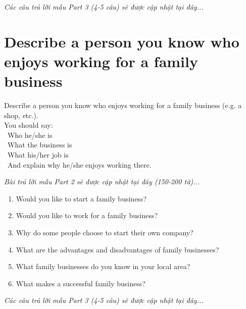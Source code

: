 \vspace{1em}
\textit{Các câu trả lời mẫu Part 3 (4-5 câu) sẽ được cập nhật tại đây...}
\vspace{2em}

\section{Describe a person you know who enjoys working for a family business}
\begin{ieltsprompt}
Describe a person you know who enjoys working for a family business (e.g. a shop, etc.). \\
You should say: \\
\textbullet\ Who he/she is \\
\textbullet\ What the business is \\
\textbullet\ What his/her job is \\
\textbullet\ And explain why he/she enjoys working there. \\
\end{ieltsprompt}

\vspace{1em}
\textit{Bài trả lời mẫu Part 2 sẽ được cập nhật tại đây (150-200 từ)...}
\vspace{2em}

\begin{ieltsprompt}
\begin{enumerate}[itemsep=4pt]
    \item Would you like to start a family business?
    \item Would you like to work for a family business?
    \item Why do some people choose to start their own company?
    \item What are the advantages and disadvantages of family businesses?
    \item What family businesses do you know in your local area?
    \item What makes a successful family business?
\end{enumerate}
\end{ieltsprompt}

\vspace{1em}
\textit{Các câu trả lời mẫu Part 3 (4-5 câu) sẽ được cập nhật tại đây...}
\vspace{2em}

